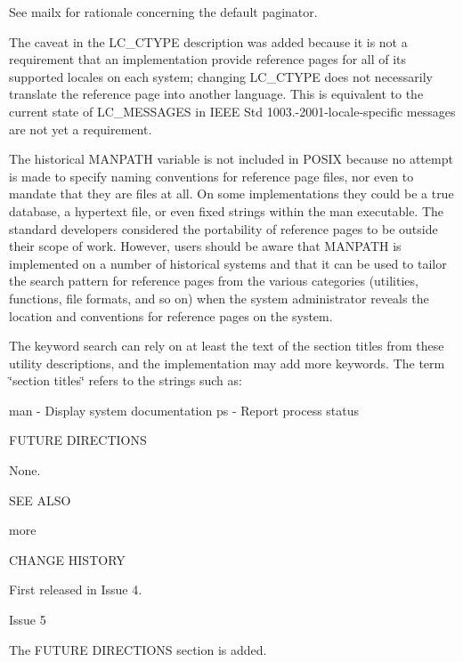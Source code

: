See mailx for rationale concerning the default paginator.

The caveat in the L\-C\-\_\-\-C\-T\-Y\-P\-E description was added because it is not a requirement that an implementation provide reference pages for all of its supported locales on each system; changing L\-C\-\_\-\-C\-T\-Y\-P\-E does not necessarily translate the reference page into another language. This is equivalent to the current state of L\-C\-\_\-\-M\-E\-S\-S\-A\-G\-E\-S in I\-E\-E\-E Std 1003.-\/2001-\/locale-\/specific messages are not yet a requirement.

The historical M\-A\-N\-P\-A\-T\-H variable is not included in P\-O\-S\-I\-X because no attempt is made to specify naming conventions for reference page files, nor even to mandate that they are files at all. On some implementations they could be a true database, a hypertext file, or even fixed strings within the man executable. The standard developers considered the portability of reference pages to be outside their scope of work. However, users should be aware that M\-A\-N\-P\-A\-T\-H is implemented on a number of historical systems and that it can be used to tailor the search pattern for reference pages from the various categories (utilities, functions, file formats, and so on) when the system administrator reveals the location and conventions for reference pages on the system.

The keyword search can rely on at least the text of the section titles from these utility descriptions, and the implementation may add more keywords. The term \char`\"{}section titles\char`\"{} refers to the strings such as\-:

man -\/ Display system documentation ps -\/ Report process status

F\-U\-T\-U\-R\-E D\-I\-R\-E\-C\-T\-I\-O\-N\-S

None.

S\-E\-E A\-L\-S\-O

more

C\-H\-A\-N\-G\-E H\-I\-S\-T\-O\-R\-Y

First released in Issue 4.

Issue 5

The F\-U\-T\-U\-R\-E D\-I\-R\-E\-C\-T\-I\-O\-N\-S section is added. 